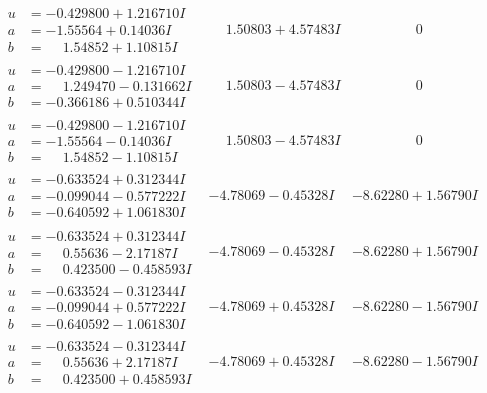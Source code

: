\documentclass[1p]{elsarticle_modified}
\theoremstyle{definition}
\begin{document}
$$\begin{array}{c|c|c}
\begin{aligned}
u &= -0.429800 + 1.216710 I \\
a &= -1.55564 + 0.14036 I \\
b &= \phantom{-}1.54852 + 1.10815 I\end{aligned}
 & \phantom{-}1.50803 + 4.57483 I & \phantom{-0.000000 } 0 \\ \hline\begin{aligned}
u &= -0.429800 - 1.216710 I \\
a &= \phantom{-}1.249470 - 0.131662 I \\
b &= -0.366186 + 0.510344 I\end{aligned}
 & \phantom{-}1.50803 - 4.57483 I & \phantom{-0.000000 } 0 \\ \hline\begin{aligned}
u &= -0.429800 - 1.216710 I \\
a &= -1.55564 - 0.14036 I \\
b &= \phantom{-}1.54852 - 1.10815 I\end{aligned}
 & \phantom{-}1.50803 - 4.57483 I & \phantom{-0.000000 } 0 \\ \hline\begin{aligned}
u &= -0.633524 + 0.312344 I \\
a &= -0.099044 - 0.577222 I \\
b &= -0.640592 + 1.061830 I\end{aligned}
 & -4.78069 - 0.45328 I & -8.62280 + 1.56790 I \\ \hline\begin{aligned}
u &= -0.633524 + 0.312344 I \\
a &= \phantom{-}0.55636 - 2.17187 I \\
b &= \phantom{-}0.423500 - 0.458593 I\end{aligned}
 & -4.78069 - 0.45328 I & -8.62280 + 1.56790 I \\ \hline\begin{aligned}
u &= -0.633524 - 0.312344 I \\
a &= -0.099044 + 0.577222 I \\
b &= -0.640592 - 1.061830 I\end{aligned}
 & -4.78069 + 0.45328 I & -8.62280 - 1.56790 I \\ \hline\begin{aligned}
u &= -0.633524 - 0.312344 I \\
a &= \phantom{-}0.55636 + 2.17187 I \\
b &= \phantom{-}0.423500 + 0.458593 I\end{aligned}
 & -4.78069 + 0.45328 I & -8.62280 - 1.56790 I\\

\end{array}$$
\end{document}
